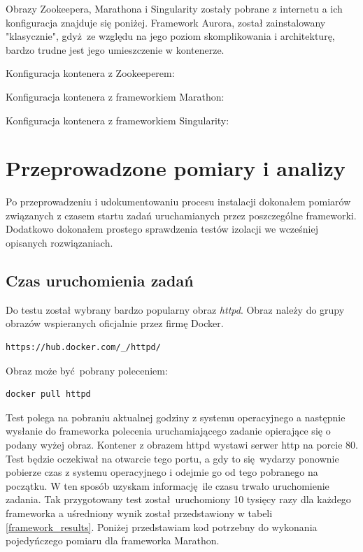 \documentclass[10pt,a4paper,titlepage,twoside]{report}
\begin{document}
Obrazy Zookeepera, Marathona i Singularity zostały pobrane z internetu a ich konfiguracja znajduje się poniżej. Framework Aurora, został zainstalowany "klasycznie", gdyż ze względu na jego poziom skomplikowania i architekturę, bardzo trudne jest jego umieszczenie w kontenerze. 

Konfiguracja kontenera z Zookeeperem:


Konfiguracja kontenera z frameworkiem Marathon:


Konfiguracja kontenera z frameworkiem Singularity:


\section{Przeprowadzone pomiary i analizy}
Po przeprowadzeniu i udokumentowaniu procesu instalacji dokonałem pomiarów związanych z czasem startu zadań uruchamianych przez poszczególne frameworki. Dodatkowo dokonałem prostego sprawdzenia testów izolacji we wcześniej opisanych rozwiązaniach.

\subsection{Czas uruchomienia zadań}
Do testu został wybrany bardzo popularny obraz \textit{httpd}. Obraz należy do grupy obrazów wspieranych oficjalnie przez firmę Docker. 
\begin{lstlisting}
https://hub.docker.com/_/httpd/
\end{lstlisting}

Obraz może być pobrany poleceniem:
\begin{lstlisting}
docker pull httpd
\end{lstlisting}

Test polega na pobraniu aktualnej godziny z systemu operacyjnego a następnie wysłanie do frameworka polecenia uruchamiającego zadanie opierające się o podany wyżej obraz. Kontener z obrazem httpd wystawi serwer http na porcie 80. Test będzie oczekiwał na otwarcie tego portu, a gdy to się wydarzy ponownie pobierze czas z systemu operacyjnego i odejmie go od tego pobranego na początku. W ten sposób uzyskam informację ile czasu trwało uruchomienie zadania. Tak przygotowany test został uruchomiony 10 tysięcy razy dla każdego frameworka a uśredniony wynik został przedstawiony w tabeli \ref{framework_results}. Poniżej przedstawiam kod potrzebny do wykonania pojedyńczego pomiaru dla frameworka Marathon.
\end{document}
